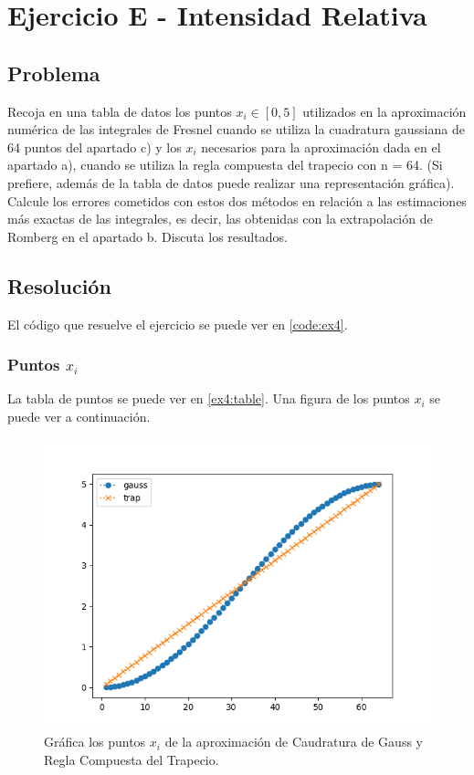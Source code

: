 \section{Ejercicio E - Intensidad Relativa}

\subsection{Problema}

Recoja en una tabla de datos los puntos $x_i \in [0, 5]$ utilizados en la aproximación numérica de las integrales de Fresnel cuando se utiliza la cuadratura gaussiana de 64 puntos del apartado c) y los $x_i$ necesarios para la aproximación dada en el apartado a), cuando se utiliza la regla compuesta del trapecio con n = 64. (Si prefiere, además de la tabla de datos puede realizar una representación gráfica). Calcule los errores cometidos con estos dos métodos en relación a las estimaciones más exactas de las integrales, es decir, las obtenidas con la extrapolación de Romberg en el apartado b. Discuta los resultados.

\subsection{Resolución}


El código que resuelve el ejercicio se puede ver en \ref{code:ex4}. 

\subsubsection{Puntos $x_i$}

La tabla de puntos se puede ver en \ref{ex4:table}. Una figura de los puntos $x_i$ se puede ver a continuación. 

\begin{figure}[h!]
	\centering
	\includegraphics[width=0.8\linewidth]{figures/gauss_trap_xi.png}
	\caption{Gráfica los puntos $x_i$ de la aproximación de Caudratura de Gauss y Regla Compuesta del Trapecio.}
	\label{fig:gauss_trap_xi}
\end{figure}

